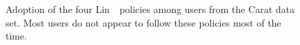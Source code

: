 \documentclass[thesis.tex]{subfiles}
\begin{document}
\begin{figure}
  \centering
  \\
  \\
  \vspace{2em}
  \caption[Adoption of Lin~\etal~policies.]{Adoption of the four Lin~\etal~policies among users from the Carat data set.  Most users do not appear to follow these policies most of the time.}
  \label{fig:lin_uptake_graphs}
\end{figure}
\end{document}
